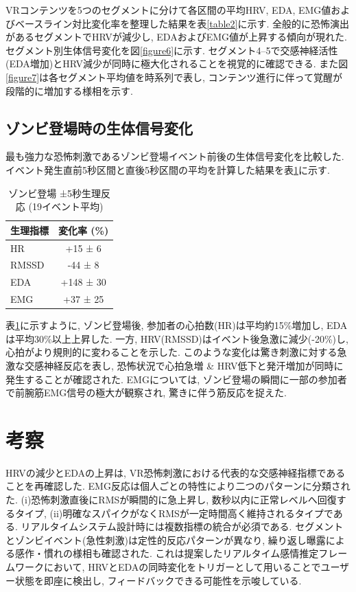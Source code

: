 \documentclass[a4paper]{jarticle}
\begin{document}
VRコンテンツを5つのセグメントに分けて各区間の平均HRV, EDA, EMG値およびベースライン対比変化率を整理した結果を表\ref{table2}に示す. 全般的に恐怖演出があるセグメントでHRVが減少し, EDAおよびEMG値が上昇する傾向が現れた. セグメント別生体信号変化を図\ref{figure6}に示す. セグメント4–5で交感神経活性(EDA増加)とHRV減少が同時に極大化されることを視覚的に確認できる. また図\ref{figure7}は各セグメント平均値を時系列で表し, コンテンツ進行に伴って覚醒が段階的に増加する様相を示す. 

\subsection{ゾンビ登場時の生体信号変化}

最も強力な恐怖刺激であるゾンビ登場イベント前後の生体信号変化を比較した.イベント発生直前5秒区間と直後5秒区間の平均を計算した結果を表\ref{table3}に示す. 

\begin{table}[tp]
\centering
\caption{ゾンビ登場 ±5秒生理反応 (19イベント平均)}
\label{table3}
\vspace*{2mm}
\footnotesize
\begin{tabular}{|l|c|}
\hline
\textbf{生理指標} & \textbf{変化率 (\%)} \\
\hline
HR & +15 ± 6 \\
\hline
RMSSD & -44 ± 8 \\
\hline
EDA & +148 ± 30 \\
\hline
EMG & +37 ± 25 \\
\hline
\end{tabular}
\end{table}

表\ref{table3}に示すように, ゾンビ登場後, 参加者の心拍数(HR)は平均約15\%増加し, EDAは平均30\%以上上昇した. 一方, HRV(RMSSD)はイベント後急激に減少(-20\%)し, 心拍がより規則的に変わることを示した. このような変化は驚き刺激に対する急激な交感神経反応を表し, 恐怖状況で心拍急増 \& HRV低下と発汗増加が同時に発生することが確認された. EMGについては, ゾンビ登場の瞬間に一部の参加者で前腕筋EMG信号の極大が観察され, 驚きに伴う筋反応を捉えた.

\section{考察}%

HRVの減少とEDAの上昇は, VR恐怖刺激における代表的な交感神経指標であることを再確認した. EMG反応は個人ごとの特性により二つのパターンに分類された. (i)恐怖刺激直後にRMSが瞬間的に急上昇し, 数秒以内に正常レベルへ回復するタイプ, (ii)明確なスパイクがなくRMSが一定時間高く維持されるタイプである. リアルタイムシステム設計時には複数指標の統合が必須である. セグメントとゾンビイベント(急性刺激)は定性的反応パターンが異なり, 繰り返し曝露による感作・慣れの様相も確認された. これは提案したリアルタイム感情推定フレームワークにおいて, HRVとEDAの同時変化をトリガーとして用いることでユーザー状態を即座に検出し, フィードバックできる可能性を示唆している.
\end{document}
